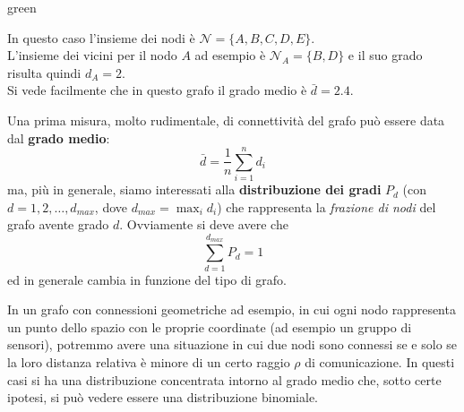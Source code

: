 \begin{mybox}[breakable]{green}{}
\label{exmp:grafoconn}
\begin{minipage}{0.5\textwidth}
\end{minipage}
\begin{minipage}{0.5\textwidth}
In questo caso l'insieme dei nodi \`e $\mathcal{N} = \{A,B,C,D,E\}$. \\
L'insieme dei vicini per il nodo $A$ ad esempio \`e $\mathcal{N}_A = \{B,D\}$ e il suo grado risulta quindi $d_A = 2$. \\
Si vede facilmente che in questo grafo il grado medio \`e $\bar{d} = 2.4$.
\end{minipage}
\end{mybox}
Una prima misura, molto rudimentale, di connettivit\`a del grafo pu\`o essere data dal \textbf{grado medio}:
\begin{equation}
\bar{d} = \frac{1}{n} \sum_{i=1}^n d_i
\end{equation}
ma, pi\`u in generale, siamo interessati alla \textbf{distribuzione dei gradi} $P_d$ (con $d = 1, 2, \dots, d_{max}$, dove $d_{max} = \max_{i} d_i$) che rappresenta la \textit{frazione di nodi} del grafo avente grado $d$. Ovviamente si deve avere che
\begin{equation}
\sum_{d=1}^{d_{max}} P_d = 1
\end{equation}
ed in generale cambia in funzione del tipo di grafo.

In un grafo con connessioni geometriche ad esempio, in cui ogni nodo rappresenta un punto dello spazio con le proprie coordinate (ad esempio un gruppo di sensori), potremmo avere una situazione in cui due nodi sono connessi se e solo se la loro distanza relativa \`e minore di un certo raggio $\rho$ di comunicazione. In questi casi si ha una distribuzione concentrata intorno al grado medio che, sotto certe ipotesi, si pu\`o vedere essere una distribuzione binomiale.

